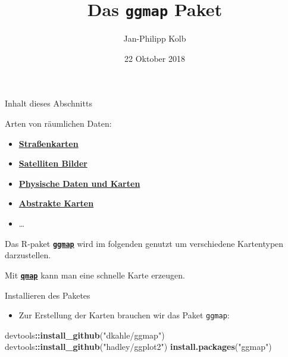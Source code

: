 \documentclass[ignorenonframetext,]{beamer}
\title{Das \texttt{ggmap} Paket}
\author{Jan-Philipp Kolb}
\date{22 Oktober 2018}
\newenvironment{Shaded}{\begin{snugshade}}{\end{snugshade}}
\newcommand{\KeywordTok}[1]{\textcolor[rgb]{0.13,0.29,0.53}{\textbf{#1}}}
\newcommand{\StringTok}[1]{\textcolor[rgb]{0.31,0.60,0.02}{#1}}
\newcommand{\OperatorTok}[1]{\textcolor[rgb]{0.81,0.36,0.00}{\textbf{#1}}}
\newcommand{\NormalTok}[1]{#1}
\providecommand{\tightlist}{%
  \setlength{\itemsep}{0pt}\setlength{\parskip}{0pt}}
\begin{document}
\frame{\titlepage}

\begin{frame}[fragile]{Inhalt dieses Abschnitts}

Arten von räumlichen Daten:

\begin{itemize}
\tightlist
\item
  \href{https://www.nceas.ucsb.edu/~frazier/RSpatialGuides/ggmap/ggmapCheatsheet.pdf}{\textbf{Straßenkarten}}
\item
  \href{http://www.mostlymuppet.com/tag/maps/}{\textbf{Satelliten
  Bilder}}
\item
  \href{http://gis.stackexchange.com/questions/3083/what-makes-a-map-beautiful/45518\#45518}{\textbf{Physische
  Daten und Karten}}
\item
  \href{http://www.designfaves.com/2014/03/abstracted-maps-reveal-cities-personalities}{\textbf{Abstrakte
  Karten}}
\item
  \ldots{}
\end{itemize}

Das R-paket
\href{http://journal.r-project.org/archive/2013-1/kahle-wickham.pdf}{\textbf{\texttt{ggmap}}}
wird im folgenden genutzt um verschiedene Kartentypen darzustellen.

Mit
\href{http://www.inside-r.org/packages/cran/ggmap/docs/qmap}{\textbf{\texttt{qmap}}}
kann man eine schnelle Karte erzeugen.

\end{frame}

\begin{frame}[fragile]{Installieren des Paketes}

\begin{itemize}
\tightlist
\item
  Zur Erstellung der Karten brauchen wir das Paket \texttt{ggmap}:
\end{itemize}

\begin{Shaded}
\begin{Highlighting}[]
\NormalTok{devtools}\OperatorTok{::}\KeywordTok{install_github}\NormalTok{(}\StringTok{"dkahle/ggmap"}\NormalTok{)}
\NormalTok{devtools}\OperatorTok{::}\KeywordTok{install_github}\NormalTok{(}\StringTok{"hadley/ggplot2"}\NormalTok{)}
\KeywordTok{install.packages}\NormalTok{(}\StringTok{"ggmap"}\NormalTok{)}
\end{Highlighting}
\end{Shaded}

\end{frame}
\end{document}
